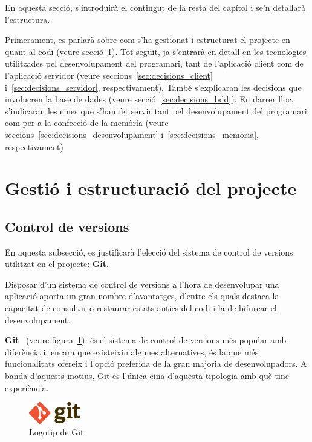 \documentclass[a4paper,12pt]{ThesisStyle}
\begin{document}
En aquesta secció, s'introduirà el contingut de la resta del capítol i se'n detallarà l'estructura.

Primerament, es parlarà sobre com s'ha gestionat i estructurat el projecte en quant al codi (veure secció~\ref{sec:decisions_estructura}). Tot seguit, ja s'entrarà en detall en les tecnologies utilitzades pel desenvolupament del programari, tant de l'aplicació client com de l'aplicació servidor (veure seccions~\ref{sec:decisions_client} i~\ref{sec:decisions_servidor}, respectivament). També s'explicaran les decisions que involucren la base de dades (veure secció~\ref{sec:decisions_bdd}). En darrer lloc, s'indicaran les eines que s'han fet servir tant pel desenvolupament del programari com per a la confecció de la memòria (veure seccions~\ref{sec:decisions_desenvolupament} i~\ref{sec:decisions_memoria}, respectivament)

\section{Gestió i estructuració del projecte}
\label{sec:decisions_estructura}

\subsection{Control de versions}
\label{subsec:decisions_estructura_versions}

En aquesta subsecció, es justificarà l'elecció del sistema de control de versions utilitzat en el projecte: \textbf{Git}.

Disposar d'un sistema de control de versions a l'hora de desenvolupar una aplicació aporta un gran nombre d'avantatges, d'entre els quals destaca la capacitat de consultar o restaurar estats antics del codi i la de bifurcar el desenvolupament.

\textbf{Git}~\cite{Git} (veure figura~\ref{img:logo_git}), és el sistema de control de versions més popular amb diferència i, encara que existeixin algunes alternatives, és la que més funcionalitats ofereix i l'opció preferida de la gran majoria de desenvolupadors. A banda d'aquests motius, Git és l'única eina d'aquesta tipologia amb què tinc experiència. 

\begin{figure}[H]
  \centering
  \includegraphics[width=0.2\textwidth]{assets/logos/Git.png}
  \caption{\label{img:logo_git}Logotip de Git.}
\end{figure}
\end{document}
